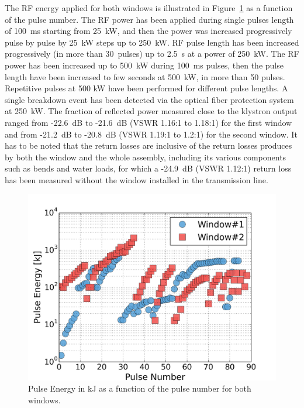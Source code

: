 {The RF energy applied for both windows is illustrated in Figure~\ref{fig:iterwindowspulseenergy} as a function of the pulse number. The RF power has been applied during single pulses length of 100~ms starting from 25~kW, and then the power was increased progressively pulse by pulse by 25~kW steps up to 250~kW. RF pulse length has been increased progressively (in more than 30~pulses) up to 2.5~s at a power of 250~kW. The RF power has been increased up to 500~kW during 100~ms pulses, then the pulse length have been increased to few seconds at 500~kW, in more than 50 pulses. Repetitive pulses at 500 kW have been performed for different pulse lengths. A single breakdown event has been detected via the optical fiber protection system at 250~kW. The fraction of reflected power measured close to the klystron output ranged from -22.6~dB to -21.6~dB (VSWR 1.16:1 to 1.18:1) for the first window and from -21.2~dB to -20.8~dB (VSWR 1.19:1 to 1.2:1) for the second window. It has to be noted that the return losses are inclusive of the return losses produces by both the window and the whole assembly, including its various components such as bends and water loads, for which a -24.9~dB (VSWR 1.12:1) return loss has been measured without the window installed in the transmission line.

\begin{figure}
	\centering
	\includegraphics[width=1.0\linewidth]{figures/chap3/ITER_window/ITER_windows_pulse_energy}
	\caption{Pulse Energy in kJ as a function of the pulse number for both windows.}
	\label{fig:iterwindowspulseenergy}
\end{figure}

}
